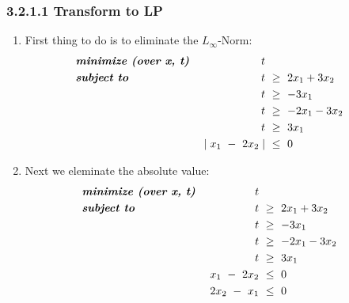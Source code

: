 \documentclass{report}
\begin{document}
	\subsubsection*{3.2.1.1 Transform to LP}
	\begin{enumerate}
		\item First thing to do is to eliminate the $L_{\infty}$-Norm:
		\begin{align*}
			& \textit{\textbf{minimize (over x, t)}} & t \ \\
			& \textit{\textbf{subject to}} & \ t \ & \geq \ 2x_1 + 3x_2 \\
			& & \ t \ & \geq \ -3x_1 \\
			& & \ t \ & \geq \ -2x_1-3x_2 \\
			& & \ t \ & \geq \ 3x_1 \\
			& & \ \mid x_1 \ - \ 2x_2 \mid \ & \leq \ 0
		\end{align*}
		\item Next we eleminate the absolute value:
		\begin{align*}
			& \textit{\textbf{minimize (over x, t)}} & t \ \\
			& \textit{\textbf{subject to}} & \ t \ & \geq \ 2x_1 + 3x_2 \\
			& & \ t \ & \geq \ -3x_1 \\
			& & \ t \ & \geq \ -2x_1-3x_2 \\
			& & \ t \ & \geq \ 3x_1 \\
			& & \ x_1 \ - \ 2x_2 \ & \leq \ 0 \\
			& & \ 2x_2 \ - \ x_1 \ & \leq \ 0
		\end{align*}
	\end{enumerate}
\end{document}
